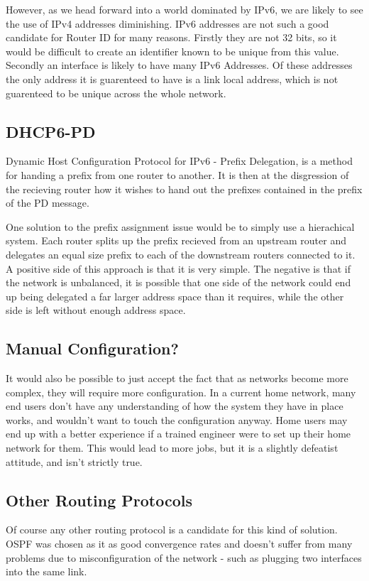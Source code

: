 \documentclass[12pt]{report}
\begin{document}
However, as we head forward into a world dominated by IPv6, we are likely to see the 
use of IPv4 addresses diminishing. IPv6 addresses are not such a good candidate for 
Router ID for many reasons. Firstly they are not 32 bits, so it would be difficult 
to create an identifier known to be unique from this value. Secondly an interface is 
likely to have many IPv6 Addresses. Of these addresses the only address it is 
guarenteed to have is a link local address, which is not guarenteed to be unique 
across the whole network. 

\subsection{DHCP6-PD}
Dynamic Host Configuration Protocol for IPv6 - Prefix Delegation, is a method for 
handing a prefix from one router to another. It is then at the disgression of the 
recieving router how it wishes to hand out the prefixes contained in the prefix of 
the PD message. 

One solution to the prefix assignment issue would be to simply use a hierachical 
system. Each router splits up the prefix recieved from an upstream router and 
delegates an equal size prefix to each of the downstream routers connected to it. A 
positive side of this approach is that it is very simple. The negative is that if 
the network is unbalanced, it is possible that one side of the network could end up 
being delegated a far larger address space than it requires, while the other side is 
left without enough address space.  

\subsection{Manual Configuration?}
It would also be possible to just accept the fact that as networks become more 
complex, they will require more configuration. In a current home network, many end 
users don't have any understanding of how the system they have in place works, and 
wouldn't want to touch the configuration anyway. Home users may end up with a better 
experience if a trained engineer were to set up their home network for them. This 
would lead to more jobs, but it is a slightly defeatist attitude, and isn't strictly 
true. 

\subsection{Other Routing Protocols}
Of course any other routing protocol is a candidate for this kind of solution. OSPF 
was chosen as it as good convergence rates and doesn't suffer from many problems due 
to misconfiguration of the network - such as plugging two interfaces into the same 
link.
\end{document}
